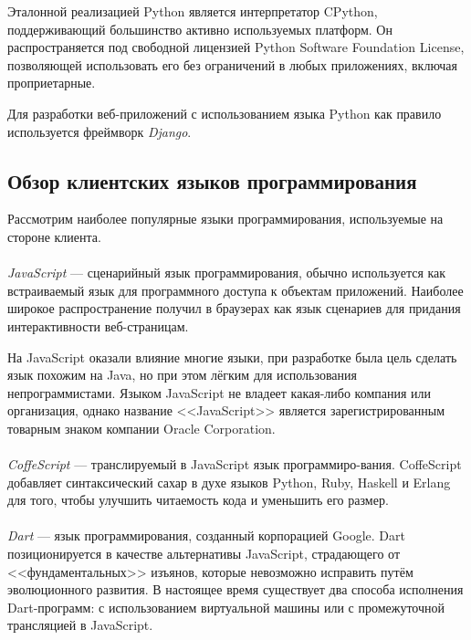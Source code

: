 Эталонной реализацией Python является интерпретатор CPython, поддерживающий большинство
активно используемых платформ. Он распространяется под свободной
лицензией Python Software Foundation License, позволяющей использовать его без ограничений
в любых приложениях, включая проприетарные.

Для разработки веб-приложений с использованием языка Python как правило используется
фреймворк \textit{Django}.

\subsection{Обзор клиентских языков программирования}
\label{sub:choice_client_language}

Рассмотрим наиболее популярные языки программирования, используемые на стороне клиента.

\paragraph{}
\textit{JavaScript} --- сценарийный язык программирования, обычно используется как
встраиваемый язык для программного доступа к объектам приложений. Наиболее широкое
распространение получил в браузерах как язык сценариев для придания интерактивности
веб-страницам.

На JavaScript оказали влияние многие языки, при разработке была цель сделать язык
похожим на Java, но при этом лёгким для использования непрограммистами.
Языком JavaScript не владеет какая-либо компания или организация, однако
название <<JavaScript>> является зарегистрированным товарным знаком компании Oracle Corporation.

\paragraph{}
\textit{CoffeScript} --- транслируемый в JavaScript язык программиро-вания. CoffeScript
добавляет синтаксический сахар в духе языков Python, Ruby, Haskell и Erlang для того,
чтобы улучшить читаемость кода и уменьшить его размер.

\paragraph{}
\textit{Dart} --- язык программирования, созданный корпорацией Google. Dart позиционируется в качестве
альтернативы JavaScript, страдающего от <<фундаментальных>> изъянов, которые невозможно
исправить путём эволюционного развития. В настоящее время существует два способа исполнения
Dart-программ: с использованием виртуальной машины или с промежуточной трансляцией в JavaScript.


